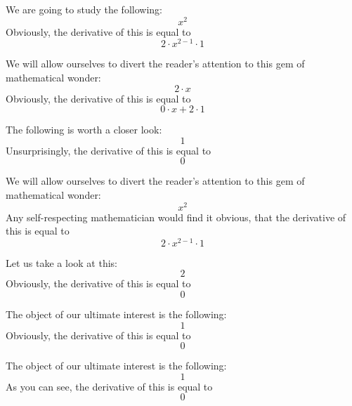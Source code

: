 \documentclass{article}
\begin{document}
We are going to study the following:
\begin{equation}
x ^{2 } 
\end{equation}
Obviously, the derivative of this is equal to
\begin{equation}
2 \cdot x ^{2 - 1 } \cdot 1 
\end{equation}

We will allow ourselves to divert the reader's attention to this gem of mathematical wonder:
\begin{equation}
2 \cdot x 
\end{equation}
Obviously, the derivative of this is equal to
\begin{equation}
0 \cdot x + 2 \cdot 1 
\end{equation}

The following is worth a closer look:
\begin{equation}
1 
\end{equation}
Unsurprisingly, the derivative of this is equal to
\begin{equation}
0 
\end{equation}

We will allow ourselves to divert the reader's attention to this gem of mathematical wonder:
\begin{equation}
x ^{2 } 
\end{equation}
Any self-respecting mathematician would find it obvious, that the derivative of this is equal to
\begin{equation}
2 \cdot x ^{2 - 1 } \cdot 1 
\end{equation}

Let us take a look at this:
\begin{equation}
2 
\end{equation}
Obviously, the derivative of this is equal to
\begin{equation}
0 
\end{equation}

The object of our ultimate interest is the following:
\begin{equation}
1 
\end{equation}
Obviously, the derivative of this is equal to
\begin{equation}
0 
\end{equation}

The object of our ultimate interest is the following:
\begin{equation}
1 
\end{equation}
As you can see, the derivative of this is equal to
\begin{equation}
0 
\end{equation}
\end{document}
